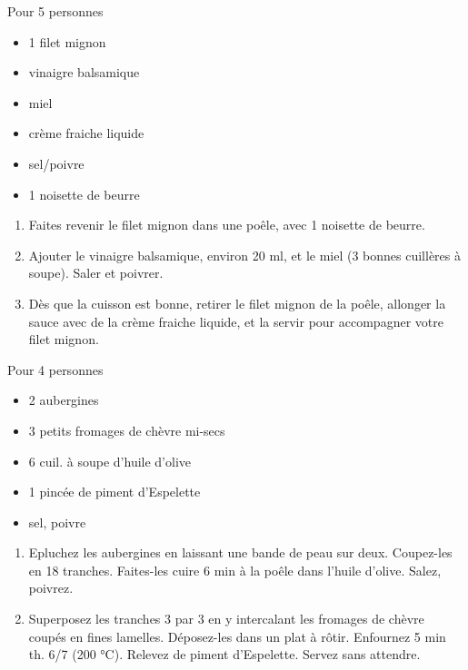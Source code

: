 \bigskip
{}
{Pour 5 personnes}{\begin{itemize}
	\item 1 filet mignon
	\item vinaigre balsamique
	\item miel
	\item crème fraiche liquide
	\item sel/poivre
	\item 1 noisette de beurre
\end{itemize}}
{\phantom{.}

\bigskip
\begin{enumerate}
	\item Faites revenir le filet mignon dans une poêle, avec 1 noisette de beurre.
	\item Ajouter le vinaigre balsamique, environ 20 ml, et le miel (3 bonnes cuillères à soupe). Saler et poivrer.
	\item Dès que la cuisson est bonne, retirer le filet mignon de la poêle, allonger la sauce avec de la crème fraiche liquide, et la servir pour accompagner votre filet mignon.
\end{enumerate}

\bigskip
\phantom{.}}

\bigskip
{}
{Pour 4 personnes}{\begin{itemize}
	\item 2 aubergines
	\item 3 petits fromages de chèvre mi-secs
	\item 6 cuil. à soupe d'huile d'olive
	\item 1 pincée de piment d'Espelette
	\item sel, poivre
\end{itemize}}
{\phantom{.}

\bigskip
\begin{enumerate}
	\item Epluchez les aubergines en laissant une bande de peau sur deux. Coupez-les en 18 tranches. Faites-les cuire 6 min à la poêle dans l'huile d'olive. Salez, poivrez.
	\item Superposez les tranches 3 par 3 en y intercalant les fromages de chèvre coupés en fines lamelles. Déposez-les dans un plat à rôtir. Enfournez 5 min th. 6/7 (200 °C). Relevez de piment d'Espelette. Servez sans attendre.
\end{enumerate}

\bigskip
\phantom{.}}

